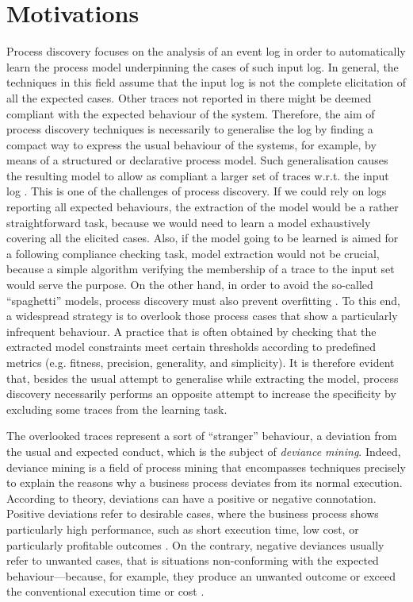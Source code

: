 
\section{Motivations}
\label{sec:motivations}
Process discovery focuses on the analysis of an event log in order to automatically learn the process model underpinning the cases of such input log. 
In general, the techniques in this field assume that the input log is not the complete elicitation of all the expected cases. Other traces not reported in there might be deemed compliant with the expected behaviour of the system. Therefore, the aim of process discovery techniques is necessarily to generalise the log by finding a compact way to express the usual behaviour of the systems, for example, by means of a structured or declarative process model. 
Such generalisation causes the resulting model to allow as compliant a larger set of traces w.r.t. the input log \cite{2011-Aalst}. This is one of the challenges of process discovery. If we could rely on logs reporting all expected behaviours, the extraction of the model would be a rather straightforward task, because we would need to learn a model exhaustively covering all the elicited cases. Also, if the model going to be learned is aimed for a following compliance checking task, model extraction would not be crucial, because a simple algorithm verifying the membership of a trace to the input set would serve the purpose.
On the other hand, in order to avoid the so-called ``spaghetti'' models, process discovery must also prevent overfitting \cite{2010-Aalst}. To this end, a widespread strategy is to overlook those process cases that show a particularly infrequent behaviour. A practice that is often obtained by checking that the extracted model constraints meet certain thresholds according to predefined metrics (e.g. fitness, precision, generality, and simplicity). 
It is therefore evident that, besides the usual attempt to generalise while extracting the model, process discovery necessarily performs an opposite attempt to increase the specificity by excluding some traces from the learning task.

The overlooked traces represent a sort of ``stranger'' behaviour, a deviation from the usual and expected conduct, which is the subject of \emph{deviance mining}\cite{2016-Nguyen}. 
%
Indeed, deviance mining is a field of process mining that encompasses techniques precisely to explain the reasons why a business process deviates from its normal execution. 
According to theory, deviations can have a positive or negative connotation. Positive deviations refer to desirable cases, where the business process shows particularly high performance, such as short execution time, low  cost, or particularly profitable outcomes \cite{2004-Spreitzer}. On the contrary, negative deviances usually refer to unwanted cases, that is situations non-conforming with the expected behaviour---because, for example, they produce an unwanted outcome or exceed the conventional execution time or cost \cite{2016-Nguyen}.
 
